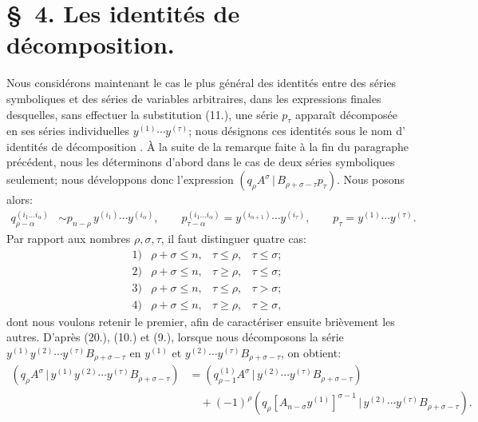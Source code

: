 \documentclass[11pt]{article}
\newcommand{\pair}[2]{(#1\,|\,#2)}
\begin{document}
\section*{\S\ 4. Les identités de décomposition.}
Nous considérons maintenant le cas le plus général des identités entre des séries symboliques et des séries de variables arbitraires, dans les expressions finales desquelles, sans effectuer la substitution (11.), une série $p_\tau$ apparaît décomposée en ses séries individuelles $y^{(1)}\cdots y^{(\tau)}$; nous désignons ces identités sous le nom d'\og{} identités de décomposition \fg{}. À la suite de la remarque faite à la fin du paragraphe précédent, nous les déterminons d'abord dans le cas de deux séries symboliques seulement; nous développons donc l'expression $\pair{q_\rho A^\sigma}{B_{\rho+\sigma-\tau}p_\tau}$. Nous posons alors:
\begin{equation}
\begin{aligned}
q_{\rho-\alpha}^{(i_1\ldots i_\alpha)}&\sim p_{n-\rho}\,y^{(i_1)}\cdots y^{(i_\alpha)},\qquad
p_{\tau-\alpha}^{(i_1\ldots i_\alpha)}=y^{(i_{\alpha+1})}\cdots y^{(i_\tau)},\qquad
p_\tau=y^{(1)}\cdots y^{(\tau)}.
\end{aligned}
\tag{22}
\end{equation}
Par rapport aux nombres $\rho,\sigma,\tau$, il faut distinguer quatre cas:
\[
\begin{array}{llll}
1)&\rho+\sigma\le n,& \tau\le\rho,& \tau\le\sigma;\\[2pt]
2)&\rho+\sigma\le n,& \tau\ge\rho,& \tau\le\sigma;\\[2pt]
3)&\rho+\sigma\le n,& \tau\le\rho,& \tau>\sigma;\\[2pt]
4)&\rho+\sigma\le n,& \tau\ge\rho,& \tau\ge\sigma,
\end{array}
\]
dont nous voulons retenir le premier, afin de caractériser ensuite brièvement les autres. D'après (20.), (10.) et (9.), lorsque nous décomposons la série $y^{(1)}y^{(2)}\cdots y^{(\tau)}B_{\rho+\sigma-\tau}$ en $y^{(1)}$ et $y^{(2)}\cdots y^{(\tau)}B_{\rho+\sigma-\tau}$, on obtient:
\begin{equation}
\begin{aligned}
\pair{q_\rho A^\sigma}{y^{(1)}y^{(2)}\cdots y^{(\tau)}B_{\rho+\sigma-\tau}}
&=\pair{q_{\rho-1}^{(1)}A^\sigma}{y^{(2)}\cdots y^{(\tau)}B_{\rho+\sigma-\tau}}\\
&\quad+(-1)^\rho\pair{q_\rho[A_{n-\sigma}y^{(1)}]^{\sigma-1}}{y^{(2)}\cdots y^{(\tau)}B_{\rho+\sigma-\tau}}.
\end{aligned}
\tag{23}
\end{equation}
\end{document}
